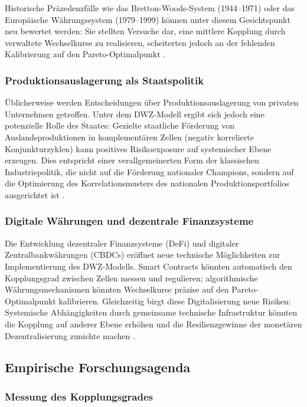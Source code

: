 ﻿\documentclass[a4paper,12pt]{article}
\theoremstyle{definition}
\begin{document}
Historische Präzedenzfälle wie das Bretton-Woods-System (1944--1971) oder das Europäische
Währungssystem (1979--1999) können unter diesem Gesichtspunkt neu bewertet werden:
Sie stellten Versuche dar, eine mittlere Kopplung durch verwaltete Wechselkurse zu realisieren,
scheiterten jedoch an der fehlenden Kalibrierung auf den Pareto-Optimalpunkt \citep{eichengreen1998globalizing}.

\subsubsection{Produktionsauslagerung als Staatspolitik}

Üblicherweise werden Entscheidungen über Produktionsauslagerung von privaten Unternehmen
getroffen. Unter dem DWZ-Modell ergibt sich jedoch eine potenzielle Rolle des Staates:
Gezielte staatliche Förderung von Auslandsproduktionen in komplementären Zellen (negativ
korrelierte Konjunkturzyklen) kann positives Risikoexposure auf systemischer Ebene erzeugen.
Dies entspricht einer verallgemeinerten Form der klassischen Industriepolitik, die nicht
auf die Förderung nationaler Champions, sondern auf die Optimierung des Korrelationsmusters
des nationalen Produktionsportfolios ausgerichtet ist \citep{rodrik2004industrial}.

\subsubsection{Digitale Währungen und dezentrale Finanzsysteme}

Die Entwicklung dezentraler Finanzsysteme (DeFi) und digitaler Zentralbankwährungen
(CBDCs) eröffnet neue technische Möglichkeiten zur Implementierung des DWZ-Modells.
Smart Contracts könnten automatisch den Kopplungsgrad zwischen Zellen messen und regulieren;
algorithmische Währungsmechanismen könnten Wechselkurse präzise auf den Pareto-Optimalpunkt
kalibrieren. Gleichzeitig birgt diese Digitalisierung neue Risiken: Systemische Abhängigkeiten
durch gemeinsame technische Infrastruktur könnten die Kopplung auf anderer Ebene erhöhen
und die Resilienzgewinne der monetären Dezentralisierung zunichte machen \citep{borio2021cbdc}.

\subsection{Empirische Forschungsagenda}

\subsubsection{Messung des Kopplungsgrades}
\end{document}

